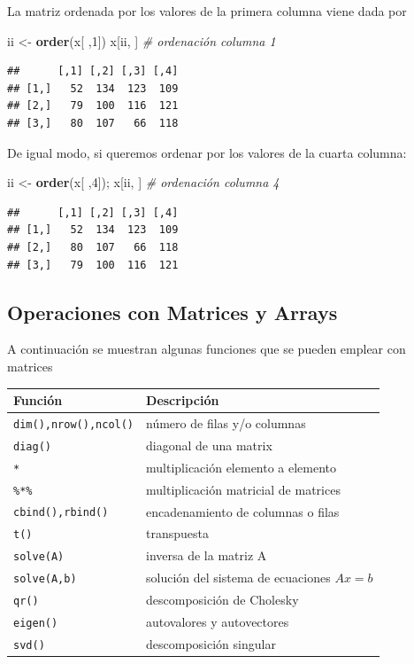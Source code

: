 \documentclass[]{book}
\newenvironment{Shaded}{\begin{snugshade}}{\end{snugshade}}
\newcommand{\KeywordTok}[1]{\textcolor[rgb]{0.13,0.29,0.53}{\textbf{#1}}}
\newcommand{\DecValTok}[1]{\textcolor[rgb]{0.00,0.00,0.81}{#1}}
\newcommand{\StringTok}[1]{\textcolor[rgb]{0.31,0.60,0.02}{#1}}
\newcommand{\CommentTok}[1]{\textcolor[rgb]{0.56,0.35,0.01}{\textit{#1}}}
\newcommand{\NormalTok}[1]{#1}
\begin{document}
La matriz ordenada por los valores de la primera columna viene dada por

\begin{Shaded}
\begin{Highlighting}[]
\NormalTok{ii <-}\StringTok{ }\KeywordTok{order}\NormalTok{(x[ ,}\DecValTok{1}\NormalTok{])}
\NormalTok{x[ii, ]  }\CommentTok{# ordenación columna 1}
\end{Highlighting}
\end{Shaded}

\begin{verbatim}
##      [,1] [,2] [,3] [,4]
## [1,]   52  134  123  109
## [2,]   79  100  116  121
## [3,]   80  107   66  118
\end{verbatim}

De igual modo, si queremos ordenar por los valores de la cuarta columna:

\begin{Shaded}
\begin{Highlighting}[]
\NormalTok{ii <-}\StringTok{ }\KeywordTok{order}\NormalTok{(x[ ,}\DecValTok{4}\NormalTok{]); x[ii, ]  }\CommentTok{# ordenación columna 4}
\end{Highlighting}
\end{Shaded}

\begin{verbatim}
##      [,1] [,2] [,3] [,4]
## [1,]   52  134  123  109
## [2,]   80  107   66  118
## [3,]   79  100  116  121
\end{verbatim}

\subsection{Operaciones con Matrices y
Arrays}\label{operaciones-con-matrices-y-arrays}

A continuación se muestran algunas funciones que se pueden emplear con
matrices

\begin{longtable}[]{@{}ll@{}}
\toprule
Función & Descripción\tabularnewline
\midrule
\endhead
\texttt{dim(),nrow(),ncol()} & número de filas y/o
columnas\tabularnewline
\texttt{diag()} & diagonal de una matrix\tabularnewline
\texttt{*} & multiplicación elemento a elemento\tabularnewline
\texttt{\%*\%} & multiplicación matricial de matrices\tabularnewline
\texttt{cbind(),rbind()} & encadenamiento de columnas o
filas\tabularnewline
\texttt{t()} & transpuesta\tabularnewline
\texttt{solve(A)} & inversa de la matriz A\tabularnewline
\texttt{solve(A,b)} & solución del sistema de ecuaciones
\(Ax=b\)\tabularnewline
\texttt{qr()} & descomposición de Cholesky\tabularnewline
\texttt{eigen()} & autovalores y autovectores\tabularnewline
\texttt{svd()} & descomposición singular\tabularnewline
\bottomrule
\end{longtable}
\end{document}
